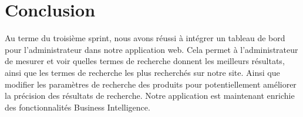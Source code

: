 \section{Conclusion}
\noindent
Au terme du troisième sprint, nous avons réussi à intégrer un tableau de bord pour
l'administrateur dans notre application web. Cela permet à l'administrateur de mesurer et voir quelles termes de recherche donnent les meilleurs résultats, ainsi que les termes de recherche les plus recherchés sur notre site. Ainsi que modifier les paramètres de recherche des produits pour potentiellement améliorer la précision des résultats de recherche. Notre application est maintenant enrichie des fonctionnalités Business Intelligence.

